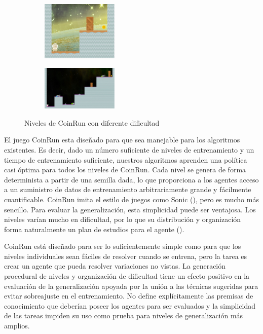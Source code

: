 \begin{figure}[ht!]
    \begin{subfigure}
      \centering
      \includegraphics[width=0.4\textwidth]{Graphics/coinrun_1.jpeg}
      \label{fig:coinrun1}
    \end{subfigure}%
    \begin{subfigure}
      \centering
      \includegraphics[width=0.4\textwidth]{Graphics/coinrun_2.jpeg}
      \label{fig:coinrun2}
    \end{subfigure}%
    \caption{Niveles de CoinRun con diferente dificultad}
    \label{fig:coinrun}
\end{figure}

El juego CoinRun esta diseñado para que sea manejable para los algoritmos existentes. Es decir, dado un número suficiente de niveles de entrenamiento y un tiempo de entrenamiento suficiente, nuestros algoritmos aprenden una política casi óptima para todos los niveles de CoinRun. Cada nivel se genera de forma determinista a partir de una semilla dada, lo que proporciona a los agentes acceso a un suministro de datos de entrenamiento arbitrariamente grande y fácilmente cuantificable. CoinRun imita el estilo de juegos como Sonic (\cite{nichol2018gotta}), pero es mucho más sencillo. Para evaluar la generalización, esta simplicidad puede ser ventajosa. Los niveles varían mucho en dificultad, por lo que su distribución y organización forma naturalmente un plan de estudios para el agente (\cite{cobbe2019quantifying}).

CoinRun está diseñado para ser lo suficientemente simple como para que los niveles individuales sean fáciles de resolver cuando se entrena, pero la tarea es crear un agente que pueda resolver variaciones no vistas. La generación procedural de niveles y organización de dificultad tiene un efecto positivo en la evaluación de la generalización apoyada por la unión a las técnicas sugeridas para evitar sobreajuste en el entrenamiento. No define explícitamente las premisas de conocimiento que deberían poseer los agentes para ser evaluados y la simplicidad de las tareas impiden su uso como prueba para niveles de generalización más amplios.

